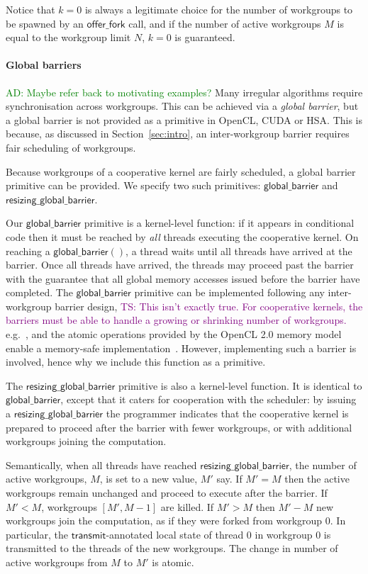 \documentclass[nocopyrightspace,10pt]{sigplanconf}
\newcommand{\ADComment}[1]{\textcolor{green}{AD: #1}}
\newcommand{\TSComment}[1]{\textcolor{purple}{TS: #1}}
\newcommand{\transmit}{\mathsf{transmit}}
\newcommand{\offerfork}{\mathsf{offer\_fork}}
\newcommand{\globalbarrier}{\mathsf{global\_barrier}}
\newcommand{\resizingglobalbarrier}{\mathsf{resizing\_global\_barrier}}
\begin{document}
Notice that $k=0$ is always a legitimate choice for the number of
workgroups to be spawned by an $\offerfork$ call, and if the number of
active workgroups $M$ is equal to the workgroup limit $N$, $k=0$ is
guaranteed.

\paragraph{Global barriers}

\ADComment{Maybe refer back to motivating examples?}
Many irregular algorithms require synchronisation across workgroups.
This can be achieved via a \emph{global barrier}, but a global barrier
is not provided as a primitive in OpenCL, CUDA or HSA.  This is
because, as discussed in Section~\ref{sec:intro}, an inter-workgroup barrier
requires fair scheduling of workgroups.

Because workgroups of a cooperative kernel are fairly scheduled, a
global barrier primitive can be provided.  We specify two such primitives: $\globalbarrier$
and $\resizingglobalbarrier$.

Our $\globalbarrier$ primitive is a kernel-level function: if it
appears in conditional code then it must be reached by \emph{all}
threads executing the cooperative kernel.  On reaching a
$\globalbarrier()$, a thread waits until all threads have arrived at
the barrier.  Once all threads have arrived, the threads may proceed
past the barrier with the guarantee that all global memory accesses
issued before the barrier have completed.  The $\globalbarrier$
primitive can be implemented following any inter-workgroup barrier
design, \TSComment{This isn't exactly true. For cooperative kernels,
  the barriers must be able to handle a growing or shrinking number of
  workgroups.} e.g.~\cite{...}, and the atomic operations provided by
the OpenCL 2.0 memory model enable a memory-safe
implementation~\cite{...}.  However, implementing such a barrier is
involved, hence why we include this function as a primitive.

The $\resizingglobalbarrier$ primitive is also a kernel-level
function.  It is identical to $\globalbarrier$, except that it caters
for cooperation with the scheduler: by issuing a
$\resizingglobalbarrier$ the programmer indicates that the cooperative
kernel is prepared to proceed after the barrier with fewer workgroups,
or with additional workgroups joining the computation.

Semantically, when all threads have reached $\resizingglobalbarrier$,
the number of active workgroups, $M$, is set to a new value, $M'$ say.
If $M' = M$ then the active workgroups remain unchanged and proceed to
execute after the barrier.  If $M' < M$, workgroups $[M', M-1]$ are
killed.  If $M' > M$ then $M'-M$ new workgroups join the computation,
as if they were forked from workgroup 0.  In particular, the
$\transmit$-annotated local state of thread 0 in workgroup 0 is
transmitted to the threads of the new workgroups.  The change in
number of active workgroups from $M$ to $M'$ is atomic.
\end{document}
